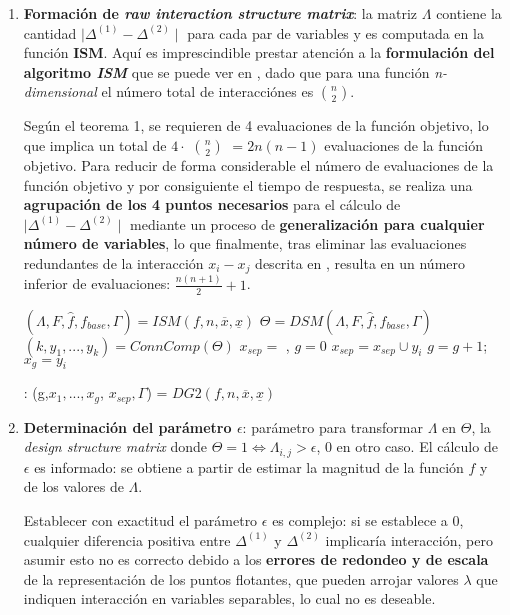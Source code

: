 \begin{enumerate}
	\item \textbf{Formación de \textit{raw interaction structure matrix}}: la matriz $\Lambda$ contiene la cantidad $\mid \Delta^{(1)} - \Delta^{(2)}\mid$ para cada par de variables y es computada en la función \textbf{ISM}. Aquí es imprescindible prestar atención a la \textbf{formulación del algoritmo \textit{ISM}} que se puede ver en \cite{DG2}, dado que para una función \textit{n-dimensional} el número total de interacciónes es $n \choose 2$.
	
	Según el teorema 1, se requieren de 4 evaluaciones de la función objetivo, lo que implica un total de  $4\cdot$ $n \choose 2$ $= 2n(n-1)$ evaluaciones de la función objetivo. Para reducir de forma considerable el número de evaluaciones de la función objetivo y por consiguiente el tiempo de respuesta, se realiza una \textbf{agrupación de los 4 puntos necesarios} para el cálculo de $\mid \Delta^{(1)} - \Delta^{(2)}\mid$ mediante un proceso de \textbf{generalización para cualquier número de variables}, lo que finalmente, tras eliminar las evaluaciones redundantes de la interacción $x_i - x_j$ descrita en \cite{DG2}, resulta en un número inferior de evaluaciones: $\frac{n(n+1)}{2}+1$.
	
	\begin{algorithm}[h]
		\begin{algorithmic}[1]
			\STATE $(\Lambda, F , \hat{f}, f_{base}, \Gamma) = ISM(f,n,  \overline{x}, \underline{x})$
			\STATE $\Theta = DSM(\Lambda, F , \hat{f}, f_{base}, \Gamma)$
			\STATE $(k, y_1,...,y_k)=ConnComp(\Theta)$
			\STATE $x_{sep} = {}$ , $g = 0$
			\STATE $x_{sep} = x_{sep} \cup y_i$
			\ELSE
			\STATE $g = g +1$; $x_g = y_i$
			\ENDIF
			\ENDFOR
		\end{algorithmic}
		\caption{: (g,$x_1,...,x_g$, $x_{sep},\Gamma$) = $DG2(f, n, \overline{x}, \underline{x})$} \label{Alg: DG2}
	\end{algorithm}
	
	\item \textbf{Determinación del parámetro $\epsilon$}: parámetro para transformar $\Lambda$ en $\Theta$, la \textit{design structure matrix} donde $\Theta = 1 \iff \Lambda_{i,j} > \epsilon$, 0 en otro caso. El cálculo de $\epsilon$ es informado: se obtiene a partir de estimar la magnitud de la función $f$ y de los valores de $\Lambda$.
	
	Establecer con exactitud el parámetro $\epsilon$ es complejo: si se establece a 0, cualquier diferencia positiva entre $\Delta^{(1)}$ y $\Delta^{(2)}$ implicaría interacción, pero asumir esto no es correcto debido a los \textbf{errores de redondeo y de escala} de la representación de los puntos flotantes, que pueden arrojar valores $\lambda$ que indiquen interacción en variables separables, lo cual no es deseable.
	

\end{enumerate}
